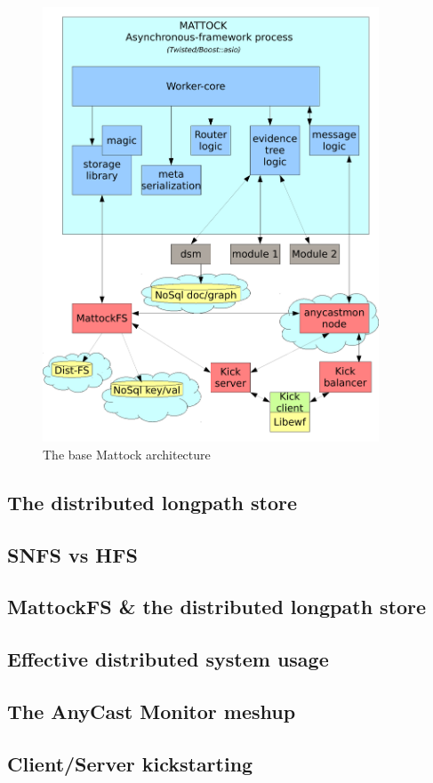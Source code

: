\begin{figure}
\centering
\includegraphics[width=100mm]{mattock/libraryviewmattock.pdf}
\caption{The base Mattock architecture}
\label{fig:FlowInOut}
\end{figure}
\subsection{The distributed longpath store}
\subsection{SNFS vs HFS}
\subsection{MattockFS \& the distributed longpath store}
\subsection{Effective distributed system usage}
\subsection{The AnyCast Monitor meshup}
\subsection{Client/Server kickstarting}
